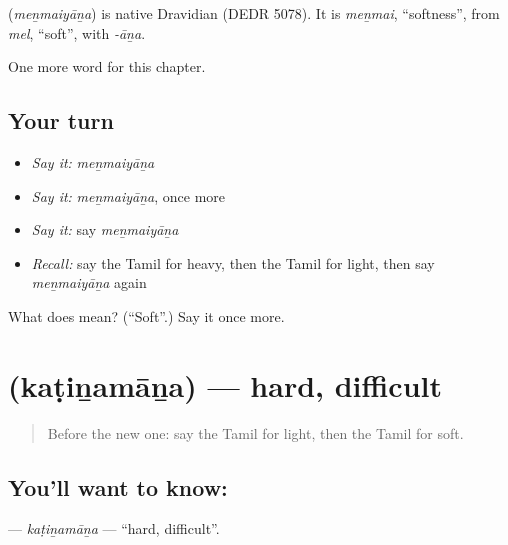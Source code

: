 \begin{cousinweb}
\textbf{} (\emph{meṉmaiyāṉa}) is native Dravidian (DEDR 5078). It is \emph{meṉmai}, \textquotedblleft{}softness\textquotedblright{}, from \emph{mel}, \textquotedblleft{}soft\textquotedblright{}, with \emph{-āṉa}.
\end{cousinweb}

\begin{grammarlens}[title={What you've built}]
One more word for this chapter.
\end{grammarlens}

\subsection*{Your turn}
\begin{itemize}
\raggedright
  \item \emph{Say it:} \emph{meṉmaiyāṉa}
  \item \emph{Say it:} \emph{meṉmaiyāṉa}, once more
  \item \emph{Say it:} say \emph{meṉmaiyāṉa}
  \item \emph{Recall:} say the Tamil for heavy, then the Tamil for light, then say \emph{meṉmaiyāṉa} again
\end{itemize}

\begin{tcolorbox}[breakable,colback=teal!4,colframe=teal!35!black,title={Before you move on}]
What does  mean? (\textquotedblleft{}Soft\textquotedblright{}.) Say it once more.
\end{tcolorbox}
\section[\texorpdfstring{\ta{கடினமான} (kaṭiṉamāṉa)}{கடினமான (kaṭiṉamāṉa)}]{ (kaṭiṉamāṉa) — hard, difficult}

\label{lesson:TA-C145-katinamana}



\begin{quote}
Before the new one: say the Tamil for light, then the Tamil for soft.
\end{quote}

\subsection*{You'll want to know: }
\textbf{} — \emph{kaṭiṉamāṉa} — \textquotedblleft{}hard, difficult\textquotedblright{}.

